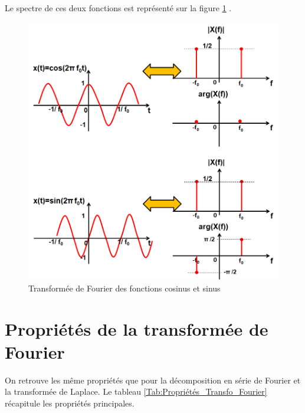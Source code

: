 	Le spectre de ces deux fonctions est représenté sur la figure \ref{Fig:TF_cos_sin} .
	
	\begin{figure}[h!]
		\centering
		\includegraphics[scale=0.4]{images/TF_cos_sin.png}
		\caption{Transformée de Fourier des fonctions cosinus et sinus}	
		\label{Fig:TF_cos_sin} 
	\end{figure}
	
	
	
	
	
	\section{Propriétés de la transformée de Fourier}
	On retrouve les même propriétés que pour la décomposition en série de Fourier et la transformée de Laplace. Le tableau \ref{Tab:Propriétés_Transfo_Fourier} récapitule les propriétés principales.
	
